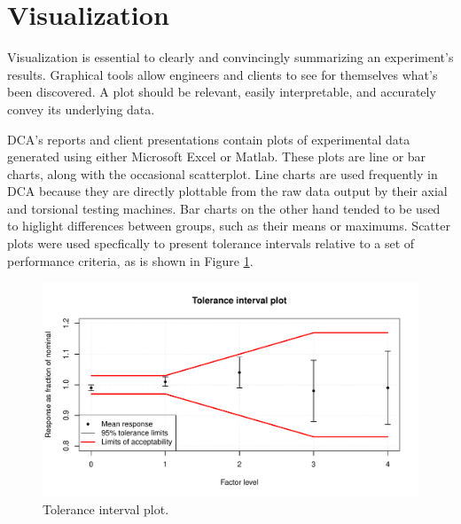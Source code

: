 \documentclass[11pt,a4paper,article]{memoir} %
\begin{document}
\newpage
\section{Visualization}
Visualization is essential to clearly and convincingly summarizing an experiment's results. Graphical tools allow engineers and clients to see for themselves what's been discovered. A plot should be relevant, easily interpretable, and accurately convey its underlying data.
\par
DCA's reports and client presentations contain plots of experimental data generated using either Microsoft Excel or Matlab. These plots are line or bar charts, along with the occasional scatterplot. Line charts are used frequently in DCA because they are directly plottable from the raw data output by their axial and torsional testing machines. Bar charts on the other hand tended to be used to higlight differences between groups, such as their means or maximums. Scatter plots were used specfically to present tolerance intervals relative to a set of performance criteria, as is shown in Figure \ref{fig:tolerance_intervals_plot}.
\begin{figure}[h!]
	\includegraphics[width=\textwidth]{tolerance_intervals_plot.pdf}
	\caption{Tolerance interval plot.}
	\label{fig:tolerance_intervals_plot}
\end{figure}
\end{document}
